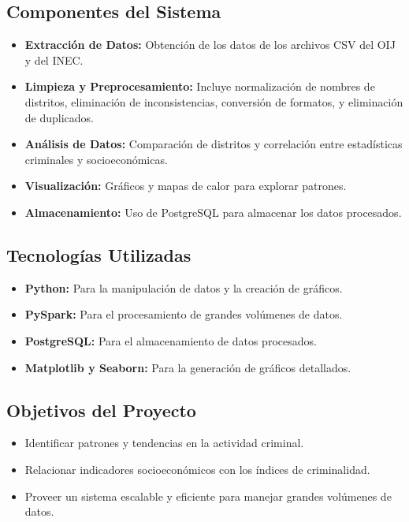 \documentclass{article}
\begin{document}
\subsection{Componentes del Sistema}

\begin{itemize}
    \item \textbf{Extracción de Datos:} Obtención de los datos de los archivos CSV del OIJ y del INEC.
    \item \textbf{Limpieza y Preprocesamiento:} Incluye normalización de nombres de distritos, eliminación de inconsistencias, conversión de formatos, y eliminación de duplicados.
    \item \textbf{Análisis de Datos:} Comparación de distritos y correlación entre estadísticas criminales y socioeconómicas.
    \item \textbf{Visualización:} Gráficos y mapas de calor para explorar patrones.
    \item \textbf{Almacenamiento:} Uso de PostgreSQL para almacenar los datos procesados.
\end{itemize}

\subsection{Tecnologías Utilizadas}

\begin{itemize}
    \item \textbf{Python:} Para la manipulación de datos y la creación de gráficos.
    \item \textbf{PySpark:} Para el procesamiento de grandes volúmenes de datos.
    \item \textbf{PostgreSQL:} Para el almacenamiento de datos procesados.
    \item \textbf{Matplotlib y Seaborn:} Para la generación de gráficos detallados.
\end{itemize}

\subsection{Objetivos del Proyecto}

\begin{itemize}
    \item Identificar patrones y tendencias en la actividad criminal.
    \item Relacionar indicadores socioeconómicos con los índices de criminalidad.
    \item Proveer un sistema escalable y eficiente para manejar grandes volúmenes de datos.
\end{itemize}
\end{document}
